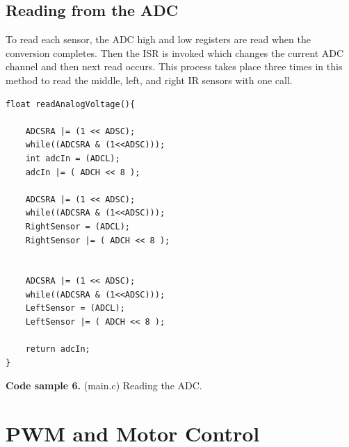 \documentclass{article}
\begin{document}
\subsection{Reading from the ADC}
To read each sensor, the ADC high and low registers are read when the conversion completes.  Then the ISR is invoked which changes the current ADC channel and then next read occurs.  This process takes place three times in this method to read the middle, left, and right IR sensors with one call.
\begin{lstlisting}
float readAnalogVoltage(){

    ADCSRA |= (1 << ADSC);
    while((ADCSRA & (1<<ADSC)));
    int adcIn = (ADCL);
    adcIn |= ( ADCH << 8 );

    ADCSRA |= (1 << ADSC);
    while((ADCSRA & (1<<ADSC)));
    RightSensor = (ADCL);
    RightSensor |= ( ADCH << 8 );


    ADCSRA |= (1 << ADSC);
    while((ADCSRA & (1<<ADSC)));
    LeftSensor = (ADCL);
    LeftSensor |= ( ADCH << 8 );

    return adcIn;
}

\end{lstlisting}
\textbf{Code sample 6.} (main.c) Reading the ADC.
\section{PWM and Motor Control}
\end{document}
